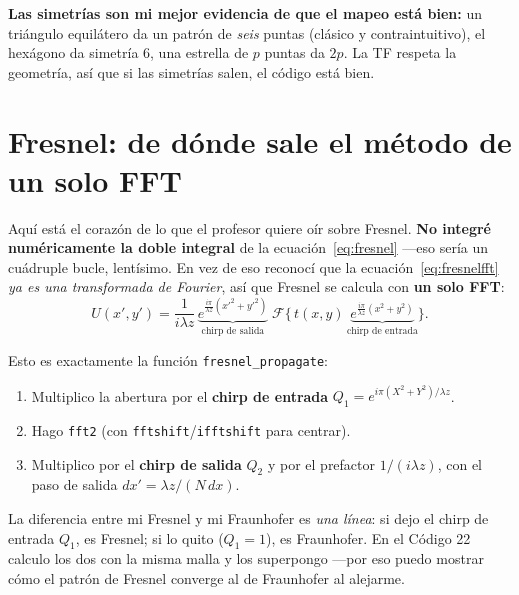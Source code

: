 \documentclass[11pt,a4paper]{article}
\newcommand{\Fou}{\mathcal{F}}
\begin{document}
\textbf{Las simetrías son mi mejor evidencia de que el mapeo está bien:} un
triángulo equilátero da un patrón de \emph{seis} puntas (clásico y
contraintuitivo), el hexágono da simetría 6, una estrella de $p$ puntas da $2p$.
La TF respeta la geometría, así que si las simetrías salen, el código está bien.

\section{Fresnel: de dónde sale el método de un solo FFT}
\label{sec:fresnel}

Aquí está el corazón de lo que el profesor quiere oír sobre Fresnel. \textbf{No
integré numéricamente la doble integral} de la ecuación~\eqref{eq:fresnel}
---eso sería un cuádruple bucle, lentísimo. En vez de eso reconocí que la
ecuación~\eqref{eq:fresnelfft} \emph{ya es una transformada de Fourier}, así que
Fresnel se calcula con \textbf{un solo FFT}:
\begin{equation}
U(x',y')=\frac{1}{i\lambda z}\,
\underbrace{e^{\frac{i\pi}{\lambda z}(x'^2+y'^2)}}_{\text{chirp de salida}}\;
\Fou\Big\{\,t(x,y)\,
\underbrace{e^{\frac{i\pi}{\lambda z}(x^2+y^2)}}_{\text{chirp de entrada}}\Big\}.
\end{equation}

Esto es exactamente la función \texttt{fresnel\_propagate}:
\begin{enumerate}[leftmargin=1.5em]
\item Multiplico la abertura por el \textbf{chirp de entrada} $Q_1=e^{i\pi(X^2+Y^2)/\lambda z}$.
\item Hago \texttt{fft2} (con \texttt{fftshift}/\texttt{ifftshift} para centrar).
\item Multiplico por el \textbf{chirp de salida} $Q_2$ y por el prefactor
$1/(i\lambda z)$, con el paso de salida $dx'=\lambda z/(N\,dx)$.
\end{enumerate}

\begin{decir}
La diferencia entre mi Fresnel y mi Fraunhofer es \emph{una línea}: si dejo el
chirp de entrada $Q_1$, es Fresnel; si lo quito ($Q_1=1$), es Fraunhofer. En el
Código 22 calculo los dos con la misma malla y los superpongo ---por eso puedo
mostrar cómo el patrón de Fresnel converge al de Fraunhofer al alejarme.
\end{decir}
\end{document}
